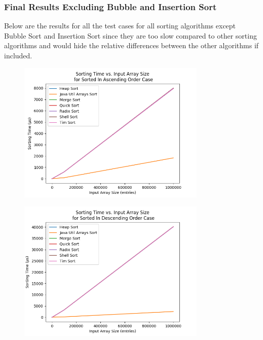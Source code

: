 \subsubsection{Final Results Excluding Bubble and Insertion Sort}

Below are the results for all the test cases for all sorting algorithms except Bubble Sort and Insertion Sort since they are too slow compared to other sorting algorithms and would hide the relative differences between the other algorithms if included.

\begin{figure}[!htp]
\centering
\includegraphics[width=9cm]{figures/plots_without_BubbleSort_InsertionSort/sorting_time_vs_input_array_size_SortedInAscendingOrderCase.png}
\end{figure}

\begin{figure}[!htp]
\centering
\includegraphics[width=9cm]{figures/plots_without_BubbleSort_InsertionSort/sorting_time_vs_input_array_size_SortedInDescendingOrderCase.png}
\end{figure}

